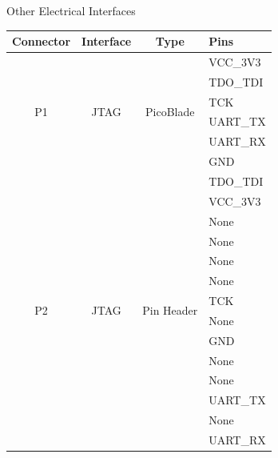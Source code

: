 \begin{frame}{Other Electrical Interfaces}

    \begin{table}[!htb]\tiny
        \centering
        \begin{tabular}{cccl}
            \toprule[1.5pt]
            \textbf{Connector} & \textbf{Interface} & \textbf{Type} & \textbf{Pins} \\
            \midrule
            \multirow{6}{*}{P1}  & \multirow{6}{*}{JTAG}  & \multirow{6}{*}{PicoBlade}   & VCC\_3V3 \\
                                 &                        &                              & TDO\_TDI \\
                                 &                        &                              & TCK \\
                                 &                        &                              & UART\_TX \\
                                 &                        &                              & UART\_RX \\
                                 &                        &                              & GND \\
            \midrule
            \multirow{14}{*}{P2} & \multirow{14}{*}{JTAG} & \multirow{14}{*}{Pin Header} & TDO\_TDI \\
                                 &                        &                              & VCC\_3V3 \\
                                 &                        &                              & None \\
                                 &                        &                              & None \\
                                 &                        &                              & None \\
                                 &                        &                              & None \\
                                 &                        &                              & TCK \\
                                 &                        &                              & None \\
                                 &                        &                              & GND \\
                                 &                        &                              & None \\
                                 &                        &                              & None \\
                                 &                        &                              & UART\_TX \\
                                 &                        &                              & None \\
                                 &                        &                              & UART\_RX \\
            

\end{tabular}
\end{table}
\end{frame}
